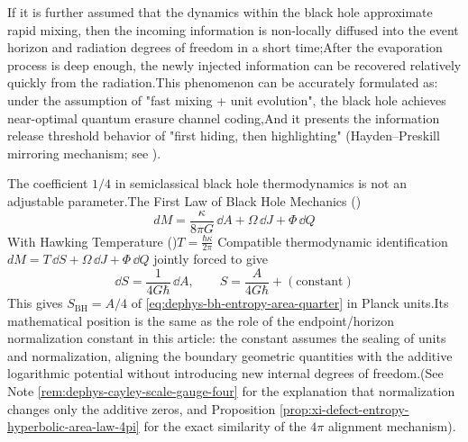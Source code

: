 \begin{remark}\label{rem:dephys-horizon-scrambler-recovery-threshold}If it is further assumed that the dynamics within the black hole approximate rapid mixing, then the incoming information is non-locally diffused into the event horizon and radiation degrees of freedom in a short time;After the evaporation process is deep enough, the newly injected information can be recovered relatively quickly from the radiation.This phenomenon can be accurately formulated as: under the assumption of "fast mixing + unit evolution", the black hole achieves near-optimal quantum erasure channel coding,And it presents the information release threshold behavior of "first hiding, then highlighting" (Hayden--Preskill mirroring mechanism; see \cite{HaydenPreskill2007BlackHolesMirrors}).\end{remark}

\begin{proposition} \label{prop:dephys-one-quarter-normalization}The coefficient \(1/4\) in semiclassical black hole thermodynamics is not an adjustable parameter.The First Law of Black Hole Mechanics (\cite{BardeenCarterHawking1973FourLaws})\[
dM=\frac{\kappa}{8\pi G}\,\dd A+\Omega\,\dd J+\Phi\,\dd Q
\]
With Hawking Temperature (\cite{Hawking1975ParticleCreation})\(
T=\frac{\hbar\kappa}{2\pi}
\)
Compatible thermodynamic identification\(
dM=T\,\dd S+\Omega\,\dd J+\Phi\,\dd Q
\)
jointly forced to give\[
\boxed{\;
\dd S=\frac{1}{4G\hbar}\,\dd A,\qquad
S=\frac{A}{4G\hbar}+(\text{constant})\;}\]
This gives \(S_{\mathrm{BH}}=A/4\) of \eqref{eq:dephys-bh-entropy-area-quarter} in Planck units.Its mathematical position is the same as the role of the endpoint/horizon normalization constant in this article: the constant assumes the sealing of units and normalization, aligning the boundary geometric quantities with the additive logarithmic potential without introducing new internal degrees of freedom.(See Note \ref{rem:dephys-cayley-scale-gauge-four} for the explanation that normalization changes only the additive zeros, and Proposition \ref{prop:xi-defect-entropy-hyperbolic-area-law-4pi} for the exact similarity of the \(4\pi\) alignment mechanism).\end{proposition}

